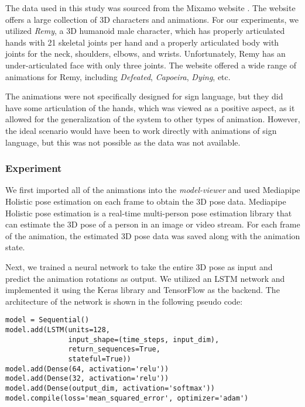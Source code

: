 The data used in this study was sourced from the Mixamo website .
The website offers a large collection of 3D characters and animations.
For our experiments, we utilized \emph{Remy}, a 3D humanoid male character, which has properly articulated hands
with 21 skeletal joints per hand and a properly articulated body with joints for the neck, shoulders, elbows, and wrists.
Unfortunately, Remy has an under-articulated face with only three joints.
The website offered a wide range of animations for Remy, including \emph{Defeated}, \emph{Capoeira}, \emph{Dying}, etc.

The animations were not specifically designed for sign language, but they did have some articulation of the hands,
which was viewed as a positive aspect, as it allowed for the generalization of the system to other types of animation.
However, the ideal scenario would have been to work directly with animations of sign language,
but this was not possible as the data was not available.

\subsubsection{Experiment}

We first imported all of the animations into the \emph{model-viewer} and used
Mediapipe Holistic pose estimation  on each frame to obtain the 3D pose data.
Mediapipe Holistic pose estimation is a real-time multi-person pose estimation library
that can estimate the 3D pose of a person in an image or video stream.
For each frame of the animation, the estimated 3D pose data was saved along with the animation state.

Next, we trained a neural network to take the entire 3D pose as input and predict the animation rotations as output.
We utilized an LSTM network and implemented it using the Keras library  and TensorFlow  as the backend.
The architecture of the network is shown in the following pseudo code:

\begin{verbatim}
model = Sequential()
model.add(LSTM(units=128,
               input_shape=(time_steps, input_dim),
               return_sequences=True,
               stateful=True))
model.add(Dense(64, activation='relu'))
model.add(Dense(32, activation='relu'))
model.add(Dense(output_dim, activation='softmax'))
model.compile(loss='mean_squared_error', optimizer='adam')
\end{verbatim}

